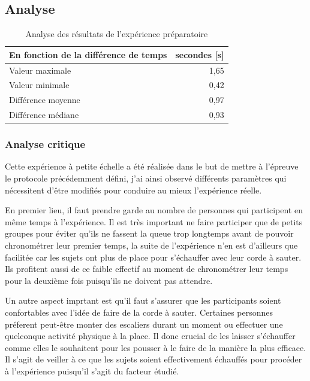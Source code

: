 \documentclass[12pt,fleqn,oneside,french,openany]{book} %
\begin{document}
\subsection{Analyse} \label{ssec:analyse2.1}

\begin{table}[h]
	\centering
	\caption{Analyse des résultats de l'expérience préparatoire} \label{tbl:analyse2.1}
	\begin{tabular}{lr}
		\toprule 
		\textbf{En fonction de la différence de temps} & \textbf{secondes [s]} \\ \midrule
		Valeur maximale & 1,65 \\
		Valeur minimale & 0,42 \\
		Différence moyenne & 0,97 \\
		Différence médiane & 0,93 \\ \bottomrule
	\end{tabular}
\end{table}

\subsubsection{Analyse critique} \label{sssec:analyseCrit2.1}
Cette expérience à petite échelle a été réalisée dans le but de mettre à l'épreuve le protocole précédemment défini, j'ai ainsi observé différents paramètres qui nécessitent d'être modifiés pour conduire au mieux l'expérience réelle. 

En premier lieu, il faut prendre garde au nombre de personnes qui participent en même temps à l'expérience. Il est très important ne faire participer que de petits groupes pour éviter qu'ils ne fassent la queue trop longtemps avant de pouvoir chronométrer leur premier temps, la suite de l'expérience n'en est d'ailleurs que facilitée car les sujets ont plus de place pour s'échauffer avec leur corde à sauter. Ils profitent aussi de ce faible effectif au moment de chronométrer leur temps pour la deuxième fois puisqu'ils ne doivent pas attendre.

Un autre aspect imprtant est qu'il faut s'assurer que les participants soient confortables avec l'idée de faire de la corde à sauter. Certaines personnes préferent peut-être monter des escaliers durant un moment ou effectuer une quelconque activité physique à la place. Il donc crucial de les laisser s'échauffer comme elles le souhaitent pour les pousser à le faire de la manière la plus efficace. Il s'agit de veiller à ce que les sujets soient effectivement échauffés pour procéder à l'expérience puisqu'il s'agit du facteur étudié.
\end{document}

